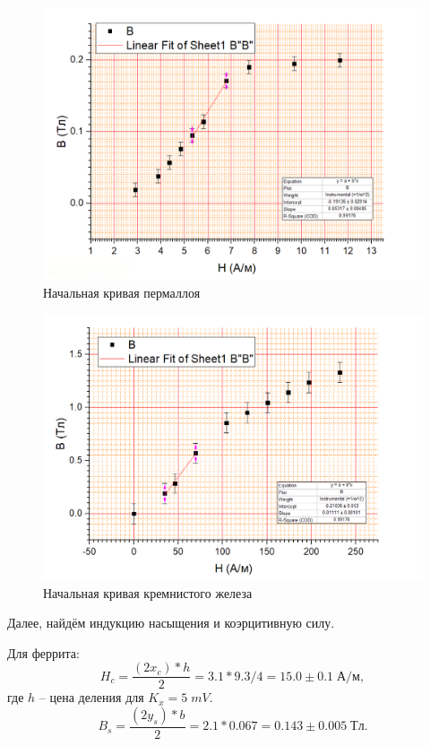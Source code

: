 \documentclass[a4paper]{article}
\begin{document}
\begin{figure}[tbp]
	\centering
	\includegraphics[width=0.8\linewidth]{Пермаллой}
	\caption{Начальная кривая пермаллоя}
	\label{fig:пермаллой}
\end{figure}

\begin{figure}[tbp]
	\centering
	\includegraphics[width=0.8\linewidth]{"Кремнистое железо"}
	\caption{Начальная кривая кремнистого железа}
	\label{fig:железо}
\end{figure}

Далее, найдём индукцию насыщения и коэрцитивную силу.

Для феррита:
\begin{equation*}\label{key}
	H_c = \frac{(2x_c) * h}{2} = 3.1 * 9.3 / 4 = 15.0 \pm 0.1 \; А/м,
\end{equation*}
где $ h $ -- цена деления для $ K_x = 5 \; mV $.
\begin{equation*}\label{key}
	B_s = \frac{(2 y_s) * b}{2} = 2.1 * 0.067 = 0.143 \pm 0.005 \; Тл.
\end{equation*}
\end{document}
